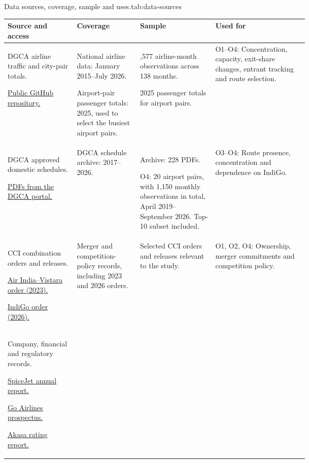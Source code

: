 \begin{resultstable}{Data sources, coverage, sample and uses.}{tab:data-sources}
\color{black}
\begin{tabularx}{\linewidth}{|>{\raggedright\arraybackslash}p{0.23\linewidth}|>{\raggedright\arraybackslash}p{0.21\linewidth}|>{\raggedright\arraybackslash}p{0.25\linewidth}|>{\raggedright\arraybackslash}X|}
\hline
\textbf{Source and access} & \textbf{Coverage} & \textbf{Sample} & \textbf{Used for}\\
\hline
DGCA airline traffic and city-pair totals.\par \href{https://github.com/mkubicek/india-aviation-stats}{Public GitHub repository.}
& National airline data: January 2015--July 2026.\par Airport-pair passenger totals: 2025, used to select the busiest airport pairs.
& 1,577 airline-month observations across 138 months.\par 2025 passenger totals for airport pairs.
& O1--O4: Concentration, capacity, exit-share changes, entrant tracking and route selection.\\
\hline
DGCA approved domestic schedules.\par \href{https://www.dgca.gov.in/digigov-portal/?page=4201/4200/servicename}{PDFs from the DGCA portal.}
& DGCA schedule archive: 2017--2026.
& Archive: 228 PDFs.\par O4: 20 airport pairs, with 1,150 monthly observations in total, April 2019--September 2026. Top-10 subset included.
& O3--O4: Route presence, concentration and dependence on IndiGo.\\
\hline
CCI combination orders and releases.\par \href{https://www.cci.gov.in/images/caseorders/en/order1695297548.pdf}{Air India--Vistara order (2023).}\par \href{https://cci.gov.in/images/antitrustorder/en/order1770207377.pdf}{IndiGo order (2026).}
& Merger and competition-policy records, including 2023 and 2026 orders.
& Selected CCI orders and releases relevant to the study.
& O1, O2, O4: Ownership, merger commitments and competition policy.\\
\hline
Company, financial and regulatory records.\par \href{https://corporate.spicejet.com/Content/pdf/AnnualReport_SpiceJet_201920.pdf}{SpiceJet annual report.}\par \href{https://www.sebi.gov.in/filings/public-issues/may-2021/go-airlines-india-limited-drhp_50122.html}{Go Airlines prospectus.}\par \href{https://www.icra.in/Rating/GetRationalReportFilePdf?id=143563}{Akasa rating report.}

\end{tabularx}
\end{resultstable}
